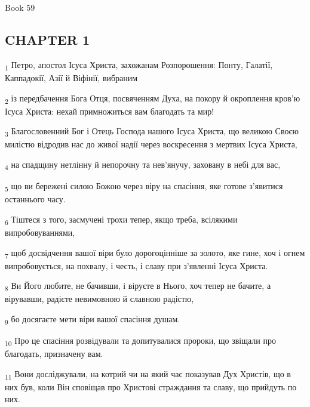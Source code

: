 Book 59
\subsection{CHAPTER 1}
\begin{tcolorbox}
\textsubscript{1} Петро, апостол Ісуса Христа, захожанам Розпорошення: Понту, Галатії, Каппадокії, Азії й Віфінії, вибраним
\end{tcolorbox}
\begin{tcolorbox}
\textsubscript{2} із передбачення Бога Отця, посвяченням Духа, на покору й окроплення кров'ю Ісуса Христа: нехай примножиться вам благодать та мир!
\end{tcolorbox}
\begin{tcolorbox}
\textsubscript{3} Благословенний Бог і Отець Господа нашого Ісуса Христа, що великою Своєю милістю відродив нас до живої надії через воскресення з мертвих Ісуса Христа,
\end{tcolorbox}
\begin{tcolorbox}
\textsubscript{4} на спадщину нетлінну й непорочну та нев'янучу, заховану в небі для вас,
\end{tcolorbox}
\begin{tcolorbox}
\textsubscript{5} що ви бережені силою Божою через віру на спасіння, яке готове з'явитися останнього часу.
\end{tcolorbox}
\begin{tcolorbox}
\textsubscript{6} Тіштеся з того, засмучені трохи тепер, якщо треба, всілякими випробовуваннями,
\end{tcolorbox}
\begin{tcolorbox}
\textsubscript{7} щоб досвідчення вашої віри було дорогоцінніше за золото, яке гине, хоч і огнем випробовується, на похвалу, і честь, і славу при з'явленні Ісуса Христа.
\end{tcolorbox}
\begin{tcolorbox}
\textsubscript{8} Ви Його любите, не бачивши, і віруєте в Нього, хоч тепер не бачите, а вірувавши, радієте невимовною й славною радістю,
\end{tcolorbox}
\begin{tcolorbox}
\textsubscript{9} бо досягаєте мети віри вашої спасіння душам.
\end{tcolorbox}
\begin{tcolorbox}
\textsubscript{10} Про це спасіння розвідували та допитувалися пророки, що звіщали про благодать, призначену вам.
\end{tcolorbox}
\begin{tcolorbox}
\textsubscript{11} Вони досліджували, на котрий чи на який час показував Дух Христів, що в них був, коли Він сповіщав про Христові страждання та славу, що прийдуть по них.
\end{tcolorbox}
